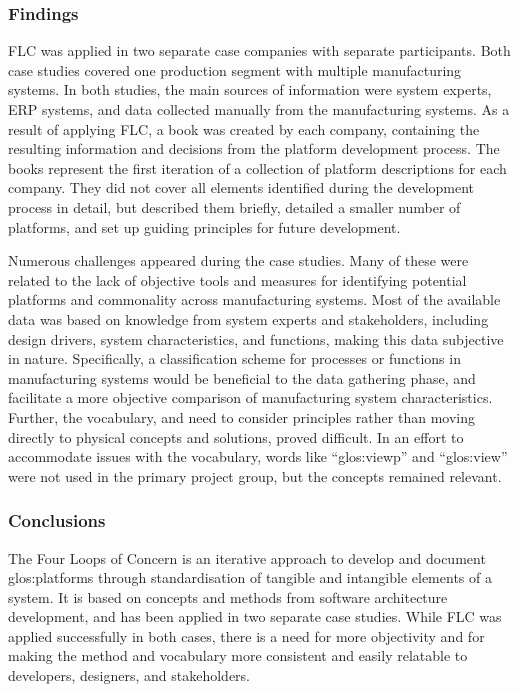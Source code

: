\subsubsection*{Findings}
FLC was applied in two separate case companies with separate participants.
Both case studies covered one production segment with multiple manufacturing systems.
In both studies, the main sources of information were system experts, ERP systems, and data collected manually from the manufacturing systems.
As a result of applying FLC, a book was created by each company, containing the resulting information and decisions from the platform development process.
The books represent the first iteration of a collection of platform descriptions for each company.
They did not cover all elements identified during the development process in detail, but described them briefly, detailed a smaller number of platforms, and set up guiding principles for future development.

Numerous challenges appeared during the case studies.
Many of these were related to the lack of objective tools and measures for identifying potential platforms and commonality across manufacturing systems.
Most of the available data was based on knowledge from system experts and stakeholders, including design drivers, system characteristics, and functions, making this data subjective in nature.
Specifically, a classification scheme for processes or functions in manufacturing systems would be beneficial to the data gathering phase, and facilitate a more objective comparison of manufacturing system characteristics.
Further, the vocabulary, and need to consider principles rather than moving directly to physical concepts and solutions, proved difficult.
In an effort to accommodate issues with the vocabulary, words like ``\gls{glos:viewp}'' and ``\gls{glos:view}'' were not used in the primary project group, but the concepts remained relevant.

\subsubsection*{Conclusions}
The Four Loops of Concern is an iterative approach to develop and document \gls{glos:platform}s through standardisation of tangible and intangible elements of a system.
It is based on concepts and methods from software architecture development, and has been applied in two separate case studies.
While FLC was applied successfully in both cases, there is a need for more objectivity and for making the method and vocabulary more consistent and easily relatable to developers, designers, and stakeholders.


